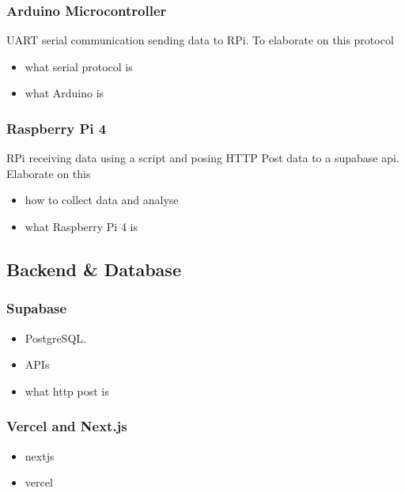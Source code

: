 \subsubsection{Arduino Microcontroller}
UART serial communication sending data to RPi. To elaborate on this protocol
\begin{itemize}
\item what serial protocol is
\item what Arduino is
\end{itemize}

\subsubsection{Raspberry Pi 4}
RPi receiving data using a script and posing HTTP Post data to a supabase api. Elaborate on this

\begin{itemize}
\item how to collect data and analyse
\item what Raspberry Pi 4 is
\end{itemize}




\subsection{Backend \& Database}
\subsubsection{Supabase}
\begin{itemize}  
	\item PostgreSQL. 
	\item APIs
	\item what http post is
\end{itemize}  

\subsubsection{Vercel and Next.js}
\begin{itemize}  
	\item nextjs 
	\item vercel
\end{itemize} 